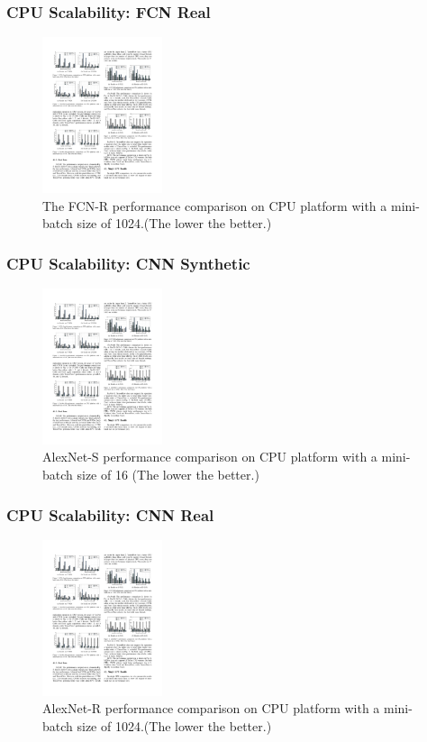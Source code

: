 
\begin{frame}
	\MyLogo
	\frametitle{CPU Scalability: FCN Real}  
	\begin{figure}[htbp] 
		\includegraphics[height=1.8in]{figures/FCN-R1.pdf} 
		\caption{The FCN-R performance comparison on CPU platform with a mini-batch size of 1024.(The lower the better.)}
	\end{figure}
\end{frame}


\begin{frame}
	\MyLogo
	\frametitle{CPU Scalability: CNN Synthetic}  

	\begin{figure}[htbp] 
		\includegraphics[height=1.8in]{figures/AlexNet-S1.pdf} 
		\caption{AlexNet-S performance comparison on CPU platform with a mini-batch size of 16 (The lower the better.)}
	\end{figure}	
\end{frame}


\begin{frame}
	\MyLogo
	\frametitle{CPU Scalability: CNN Real}  
	\begin{figure}[htbp] 
		\includegraphics[height=1.8in]{figures/AlexNet-R1.pdf} 
		\caption{AlexNet-R performance comparison on CPU platform with a mini-batch size of 1024.(The lower the better.)}
	\end{figure}
\end{frame}

